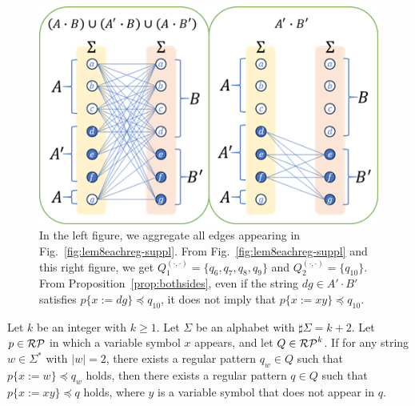 \begin{figure}[t]
  \begin{center}
    \includegraphics[scale=0.8]{figs/lem8totalreg-suppl.png}
    \caption{In the left figure, we aggregate all edges appearing in Fig.~\ref{fig:lem8eachreg-suppl}. From Fig.~\ref{fig:lem8eachreg-suppl} and this right figure, we get $Q_{1}^{(\cdot,\cdot)}=\{q_6,q_7,q_8,q_9\}$ and $Q_{2}^{(\cdot,\cdot)}=\{q_{10}\}$. From Proposition~\ref{prop:bothsides}, even if the string $dg \in A'\cdot B'$ satisfies {\color{red}$p \{ x:=dg \} \preceq q_{10}$}, it does not imply that $p \{ x:=xy \} \preceq q_{10}$.}\label{fig:lem8totalreg-suppl}
  \end{center}
\end{figure}

\begin{lem}\label{Add-Lemma01}
Let $k$ be an integer with $k\geq 1$.
Let $\Sigma$ be an alphabet with $\sharp \Sigma = k + 2$.
Let $p \in \mathcal{RP}$ in which a variable symbol $x$ appears, and let $Q \in \mathcal{RP}^{k}$.
If for any string $w \in \Sigma^{\ast}$ with $|w|=2$, there exists a regular pattern $q_{w} \in Q$ such that $p \{ x:=w \} \preceq q_{w}$ holds, then there exists a regular pattern $q \in Q$ such that $p \{ x:=xy \} \preceq q$ holds, where $y$ is a variable symbol that does not appear in $q$.
\end{lem}

